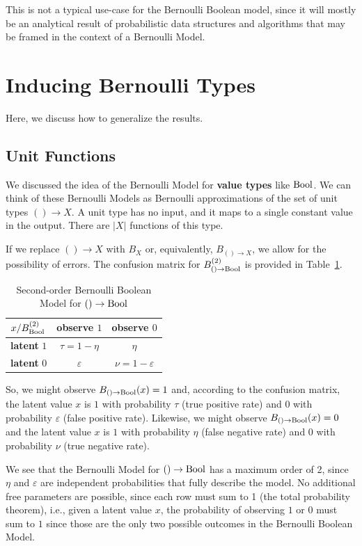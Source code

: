\documentclass[../main.tex]{subfiles}
\begin{document}
This is not a typical use-case for the Bernoulli Boolean model, since it will mostly be an analytical result of probabilistic data structures and algorithms that may be framed in the context of a Bernoulli Model.

\section{Inducing Bernoulli Types}

Here, we discuss how to generalize the results.

\subsection{Unit Functions}

We discussed the idea of the Bernoulli Model for \textbf{value types} like $\mathrm{Bool}$. We can think of these Bernoulli Models as Bernoulli approximations of the set of unit types $() \to X$. A unit type has no input, and it maps to a single constant value in the output. There are $|X|$ functions of this type.

If we replace $() \to X$ with $B_X$ or, equivalently, $B_{() \to X}$, we allow for the possibility of errors. The confusion matrix for $B_{() \to \mathrm{Bool}}^{(2)}$ is provided in Table~\ref{tbl:second_order}.

\begin{table}[htbp]
\centering
\caption{Second-order Bernoulli Boolean Model for $() \to \mathrm{Bool}$}
\label{tbl:second_order}
\begin{tabular}{@{}lcc@{}}
\toprule
$x / B_{\mathrm{Bool}}^{(2)}$ & observe $1$ & observe $0$ \\
\midrule
\textbf{latent} $1$ & $\tau = 1-\eta$ & $\eta$ \\
\textbf{latent} $0$ & $\varepsilon$ & $\nu = 1-\varepsilon$ \\
\bottomrule
\end{tabular}
\end{table}

So, we might observe $B_{() \to \mathrm{Bool}}(x) = 1$ and, according to the confusion matrix, the latent value $x$ is $1$ with probability $\tau$ (true positive rate) and $0$ with probability $\varepsilon$ (false positive rate). Likewise, we might observe $B_{() \to \mathrm{Bool}}(x) = 0$ and the latent value $x$ is $1$ with probability $\eta$ (false negative rate) and $0$ with probability $\nu$ (true negative rate).

We see that the Bernoulli Model for $() \to \mathrm{Bool}$ has a maximum order of 2, since $\eta$ and $\varepsilon$ are independent probabilities that fully describe the model. No additional free parameters are possible, since each row must sum to 1 (the total probability theorem), i.e., given a latent value $x$, the probability of observing $1$ or $0$ must sum to $1$ since those are the only two possible outcomes in the Bernoulli Boolean Model.
\end{document}
